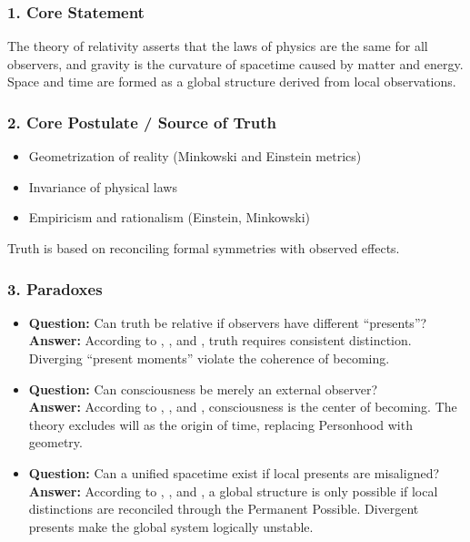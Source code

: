 \documentclass[12pt]{article}
\begin{document}
\subsubsection*{1. Core Statement}

The theory of relativity asserts that the laws of physics are the same for all observers, and gravity is the curvature of spacetime caused by matter and energy. Space and time are formed as a global structure derived from local observations.

\subsubsection*{2. Core Postulate / Source of Truth}

\begin{itemize}
\item Geometrization of reality (Minkowski and Einstein metrics)
\item Invariance of physical laws
\item Empiricism and rationalism (Einstein, Minkowski)
\end{itemize}

Truth is based on reconciling formal symmetries with observed effects.

\subsubsection*{3. Paradoxes}

\begin{itemize}
\item \textbf{Question:} Can truth be relative if observers have different ``presents''?  
\\ \textbf{Answer:} According to \text{[9.1]}, \text{[10.3.8]}, and \text{[11.1.1]}, truth requires consistent distinction. Diverging ``present moments'' violate the coherence of becoming.

\item \textbf{Question:} Can consciousness be merely an external observer?  
\\ \textbf{Answer:} According to \text{[10.5]}, \text{[10.6]}, and \text{[12]}, consciousness is the center of becoming. The theory excludes will as the origin of time, replacing Personhood with geometry.

\item \textbf{Question:} Can a unified spacetime exist if local presents are misaligned?  
\\ \textbf{Answer:} According to \text{[4.4]}, \text{[7]}, and \text{[12.4]}, a global structure is only possible if local distinctions are reconciled through the Permanent Possible. Divergent presents make the global system logically unstable.
\end{itemize}
\end{document}
